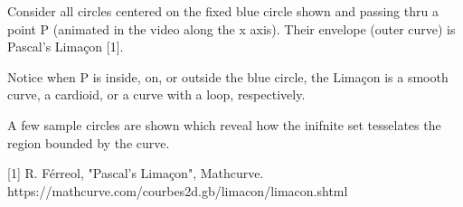 Consider all circles centered on the fixed blue circle shown and passing thru a point P (animated in the video along the x axis). Their envelope (outer curve) is Pascal's Limaçon [1].

Notice when P is inside, on, or outside the blue circle, the Limaçon is a smooth curve, a cardioid, or a curve with a loop, respectively.

A few sample circles are shown which reveal how the inifnite set tesselates  the region bounded by the curve.

[1] R. Férreol, "Pascal's Limaçon", Mathcurve. https://mathcurve.com/courbes2d.gb/limacon/limacon.shtml